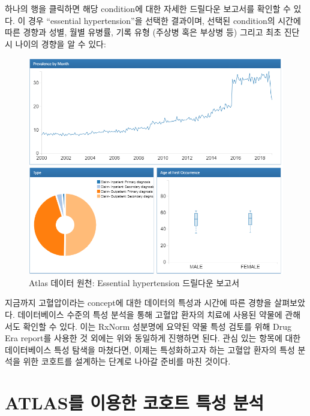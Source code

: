 \documentclass[10.5pt]{book}
\theoremstyle{definition}
\theoremstyle{definition}
\theoremstyle{definition}
\theoremstyle{remark}
\begin{document}
하나의 행을 클릭하면 해당 condition에 대한 자세한 드릴다운 보고서를
확인할 수 있다. 이 경우 ``essential hypertension''을 선택한 결과이며,
선택된 condition의 시간에 따른 경향과 성별, 월별 유병률, 기록 유형
(주상병 혹은 부상병 등) 그리고 최초 진단 시 나이의 경향을 알 수 있다:

\begin{figure}

{\centering \includegraphics[width=1\linewidth]{images/Characterization/atlasDataSourcesDrillDownReport} 

}

\caption{Atlas 데이터 원천: Essential hypertension 드릴다운 보고서}\label{fig:atlasDataSourcesDrillDownReport}
\end{figure}

지금까지 고혈압이라는 concept에 대한 데이터의 특성과 시간에 따른 경향을
살펴보았다. 데이터베이스 수준의 특성 분석을 통해 고혈압 환자의 치료에
사용된 약물에 관해서도 확인할 수 있다. 이는 RxNorm 성분명에 요약된 약물
특성 검토를 위해 Drug Era report를 사용한 것 외에는 위와 동일하게
진행하면 된다. 관심 있는 항목에 대한 데이터베이스 특성 탐색을 마쳤다면,
이제는 특성화하고자 하는 고혈압 환자의 특성 분석을 위한 코호트를
설계하는 단계로 나아갈 준비를 마친 것이다.

\section{ATLAS를 이용한 코호트 특성 분석}\label{atlas----}
\end{document}
